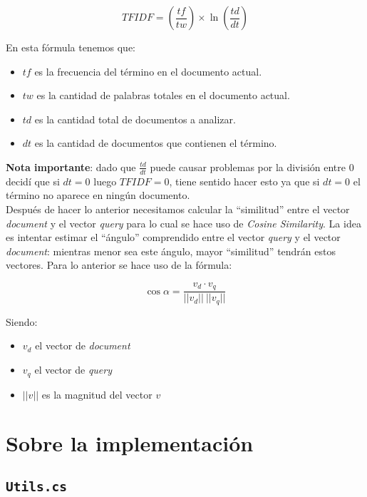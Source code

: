 \documentclass[a4paper, 12pt]{article}
\begin{document}
\begin{equation}
	TFIDF = (\frac{tf}{tw}) \times \ln(\frac{td}{dt})
\end{equation}

En esta fórmula tenemos que:
\begin{itemize}
	\item $tf$ es la frecuencia del término en el documento actual.
	\item $tw$ es la cantidad de palabras totales en el documento actual.
	\item $td$ es la cantidad total de documentos a analizar.
	\item $dt$ es la cantidad de documentos que contienen el término.
\end{itemize}

{\bf \color{red} Nota importante}: dado que $\frac{td}{dt}$ puede causar problemas por la
división entre $0$ decidí que si $dt = 0$ luego $TFIDF = 0$, tiene sentido hacer esto ya
que si $dt = 0$ el término no aparece en ningún documento.\\

Después de hacer lo anterior necesitamos calcular la ``similitud'' entre el
vector {\it document} y el vector {\it query} para lo cual se hace uso de {\it
		Cosine Similarity}. La idea es intentar estimar el ``ángulo'' comprendido entre
el vector {\it query} y el vector {\it document}: mientras menor sea este
ángulo, mayor ``similitud'' tendrán estos vectores. Para lo anterior se hace
uso de la fórmula:

\begin{equation}
	\cos \alpha = \frac{v_d \cdot v_q}{||v_d|| ~ ||v_q||}
\end{equation}

Siendo:

\begin{itemize}
	\item $v_d$ el vector de {\it document}
	\item $v_q$ el vector de {\it query}
	\item $||v||$ es la magnitud del vector $v$
\end{itemize}

\section*{Sobre la implementación}

\subsection*{\tt Utils.cs}
\end{document}

